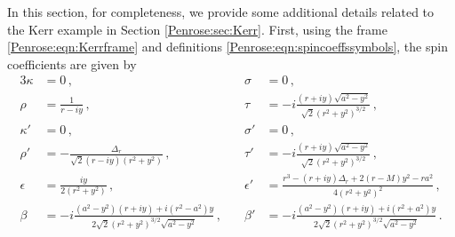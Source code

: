 In this section, for completeness, we provide some additional details related to the Kerr example in Section \ref{Penrose:sec:Kerr}. First, using the frame \eqref{Penrose:eqn:Kerrframe} and definitions \eqref{Penrose:eqn:spincoeffssymbols}, the spin coefficients are given by 
\begin{alignat}{3}
\kappa &= 0 \, ,  \quad &\sigma& = 0 \, , \nonumber \\  \rho& = \frac{1}{r-iy} \, , \quad  &\tau& = -i\frac{(r+iy)\sqrt{a^2-y^2}}{\sqrt{2}(r^2+y^2)^{3/2}}  \, , \nonumber \\
\kappa' &= 0 \, ,  \quad &\sigma'& = 0  \, , \nonumber\\ 
\rho' &= -\frac{\Delta_r}{\sqrt{2} (r-iy)(r^2+y^2)} \, , \quad &\tau'& = -i\frac{(r+iy)\sqrt{a^2-y^2}}{\sqrt{2}(r^2+y^2)^{3/2}}  \, , \nonumber  \\
\epsilon &= \frac{i y}{2(r^2+y^2)} \, ,  \quad &\epsilon'& = \frac{r^3-(r+iy) \Delta_r+2(r-M)y^2-ra^2}{4(r^2+y^2)^2}  \, , \\ \beta& = -i\frac{(a^2-y^2)(r+iy)+i(r^2-a^2)y}{2 \sqrt{2} (r^2+y^2)^{3/2}\sqrt{a^2-y^2}} \, , \quad &\beta'& = -i\frac{(a^2-y^2)(r+iy)+i(r^2+a^2)y}{2 \sqrt{2} (r^2+y^2)^{3/2}\sqrt{a^2-y^2}}  \, . \label{Penrose:eqn:Kspincoeffssymbols}
\end{alignat}

